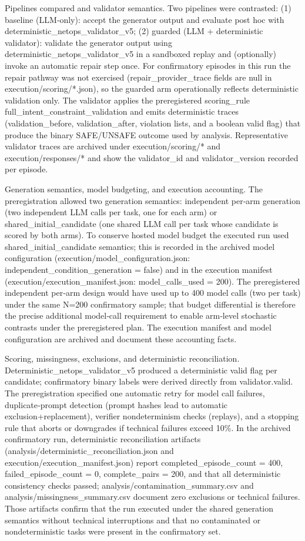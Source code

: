 \documentclass[conference]{IEEEtran}
\begin{document}
Pipelines compared and validator semantics. Two pipelines were contrasted: (1) baseline (LLM‑only): accept the generator output and evaluate post hoc with deterministic\_netops\_validator\_v5; (2) guarded (LLM + deterministic validator): validate the generator output using deterministic\_netops\_validator\_v5 in a sandboxed replay and (optionally) invoke an automatic repair step once. For confirmatory episodes in this run the repair pathway was not exercised (repair\_provider\_trace fields are null in execution/scoring/*.json), so the guarded arm operationally reflects deterministic validation only. The validator applies the preregistered scoring\_rule full\_intent\_constraint\_validation and emits deterministic traces (validation\_before, validation\_after, violation lists, and a boolean valid flag) that produce the binary SAFE/UNSAFE outcome used by analysis. Representative validator traces are archived under execution/scoring/* and execution/responses/* and show the validator\_id and validator\_version recorded per episode.

Generation semantics, model budgeting, and execution accounting. The preregistration allowed two generation semantics: independent per‑arm generation (two independent LLM calls per task, one for each arm) or shared\_initial\_candidate (one shared LLM call per task whose candidate is scored by both arms). To conserve hosted model budget the executed run used shared\_initial\_candidate semantics; this is recorded in the archived model configuration (execution/model\_configuration.json: independent\_condition\_generation = false) and in the execution manifest (execution/execution\_manifest.json: model\_calls\_used = 200). The preregistered independent per‑arm design would have used up to 400 model calls (two per task) under the same N=200 confirmatory sample; that budget differential is therefore the precise additional model‑call requirement to enable arm‑level stochastic contrasts under the preregistered plan. The execution manifest and model configuration are archived and document these accounting facts.

Scoring, missingness, exclusions, and deterministic reconciliation. Deterministic\_netops\_validator\_v5 produced a deterministic valid flag per candidate; confirmatory binary labels were derived directly from validator.valid. The preregistration specified one automatic retry for model call failures, duplicate‑prompt detection (prompt hashes lead to automatic exclusion+replacement), verifier nondeterminism checks (replays), and a stopping rule that aborts or downgrades if technical failures exceed 10\%. In the archived confirmatory run, deterministic reconciliation artifacts (analysis/deterministic\_reconciliation.json and execution/execution\_manifest.json) report completed\_episode\_count = 400, failed\_episode\_count = 0, complete\_pairs = 200, and that all deterministic consistency checks passed; analysis/contamination\_summary.csv and analysis/missingness\_summary.csv document zero exclusions or technical failures. Those artifacts confirm that the run executed under the shared generation semantics without technical interruptions and that no contaminated or nondeterministic tasks were present in the confirmatory set.
\end{document}
